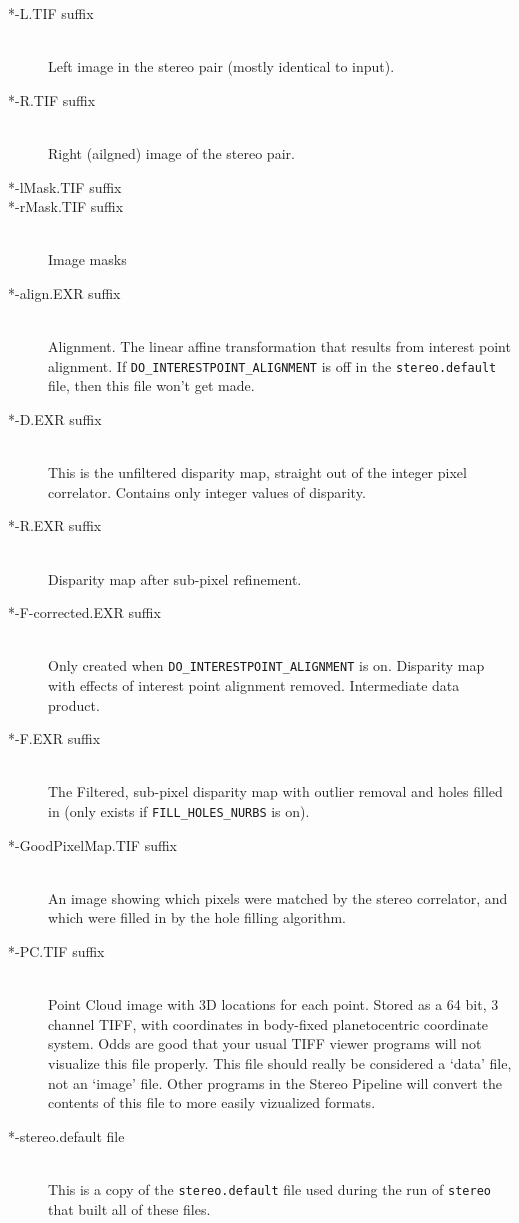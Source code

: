\begin{description}
\item[*-L.TIF suffix] \hfill \\
  Left image in the stereo pair (mostly identical to input).

\item[*-R.TIF suffix] \hfill \\
  Right (ailgned) image of the stereo pair.

\item[*-lMask.TIF suffix]
\item[*-rMask.TIF suffix] \hfill \\
  Image masks

\item[*-align.EXR suffix] \hfill \\
  Alignment.  The linear affine transformation that
  results from interest point alignment.  If
  \texttt{DO\_INTERESTPOINT\_ALIGNMENT} is off in the
  \texttt{stereo.default} file, then this file won't get made.

\item[*-D.EXR suffix] \hfill \\
  This is the unfiltered disparity map, straight
  out of the integer pixel correlator.  Contains only integer values
  of disparity.

\item[*-R.EXR suffix] \hfill \\
  Disparity map after sub-pixel refinement.

\item[*-F-corrected.EXR suffix] \hfill \\
  Only created when \texttt{DO\_INTERESTPOINT\_ALIGNMENT} is on.
  Disparity map with effects of interest point alignment removed.
  Intermediate data product.

\item[*-F.EXR suffix] \hfill \\
  The Filtered, sub-pixel disparity map with outlier removal and holes
  filled in (only exists if \texttt{FILL\_HOLES\_NURBS} is on).

\item[*-GoodPixelMap.TIF suffix] \hfill \\
  An image showing which pixels were matched by the stereo correlator,
  and which were filled in by the hole filling algorithm.

\item[*-PC.TIF suffix] \hfill \\
  Point Cloud image with 3D locations for each point.  Stored as a
  64 bit, 3 channel TIFF, with coordinates in body-fixed planetocentric
  coordinate system.  Odds are good that your usual TIFF viewer
  programs will not visualize this file properly.  This file should
  really be considered a `data' file, not an `image' file.  Other
  programs in the Stereo Pipeline will convert the contents of this
  file to more easily vizualized formats.

\item[*-stereo.default file] \hfill \\
  This is a copy of the \texttt{stereo.default} file
  used during the run of \texttt{stereo} that built all of these
  files.


\end{description}

